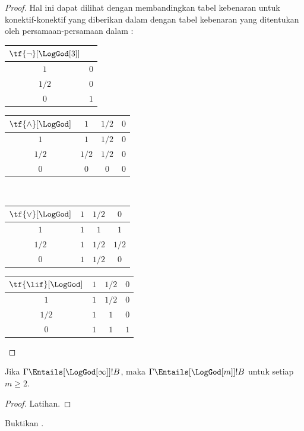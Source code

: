 \documentclass[../../../include/open-logic-section]{subfiles}
\begin{document}
\begin{proof}
  Hal ini dapat dilihat dengan membandingkan tabel kebenaran untuk
  konektif-konektif yang diberikan dalam 
  dengan tabel kebenaran yang ditentukan oleh persamaan-persamaan dalam
  :
  \begin{center}
    \begin{tabular}{c|c} 
      $\tf{\lnot}[\LogGod[3]]$ & \\ 
      \hline  
      $1$ & $0$ \\ 
      $1/2$ & $0$ \\
      $0$ & $1$ 
    \end{tabular}
    \quad
    \begin{tabular}{c|ccc} 
      $\tf{\land}[\LogGod]$ & $1$ & $1/2$ & $0$ \\ 
      \hline 
      $1$ & $1$ & $1/2$ & $0$ \\ 
      $1/2$ & $1/2$ & $1/2$ & $0$\\ 
      $0$ & $0$ & $0$ & $0$ 
    \end{tabular}
    \\[2ex]
    \begin{tabular}{c|ccc} 
      $\tf{\lor}[\LogGod]$ & $1$ & $1/2$ & $0$ \\ 
      \hline 
      $1$ & $1$ & $1$ & $1$ \\ 
      $1/2$ & $1$ & $1/2$ & $1/2$ \\
      $0$ & $1$ & $1/2$ & $0$ 
    \end{tabular}
    \quad
    \begin{tabular}{c|ccc} 
      $\tf{\lif}[\LogGod]$ & $1$ & $1/2$ & $0$ \\ 
      \hline 
      $1$ & $1$ & $1/2$ & $0$ \\ 
      $1/2$ & $1$ & $1$ & $0$  \\ 
      $0$ & $1$ & $1$ & $1$ 
    \end{tabular}
  \end{center} 
\end{proof}

\begin{prop}
  Jika $\Gamma \Entails[\LogGod[\infty]] !B$, maka $\Gamma
  \Entails[\LogGod[m]] !B$ untuk setiap~$m \ge 2$.
\end{prop}

\begin{proof}
  Latihan.
\end{proof}

\begin{prob}
  Buktikan .
\end{prob}
\end{document}
